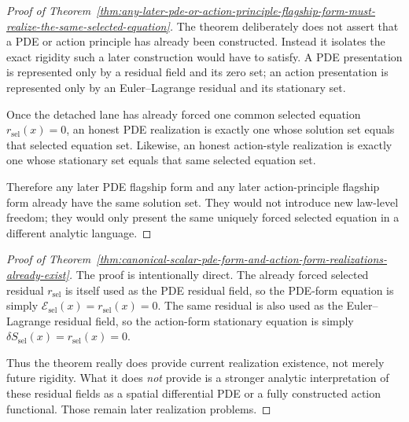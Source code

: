 \begin{proof}[Proof of Theorem~\ref{thm:any-later-pde-or-action-principle-flagship-form-must-realize-the-same-selected-equation}]
\label{proof:thm:any-later-pde-or-action-principle-flagship-form-must-realize-the-same-selected-equation}
The theorem deliberately does not assert that a PDE or action principle has
already been constructed. Instead it isolates the exact rigidity such a later
construction would have to satisfy. A PDE presentation is represented only by a
residual field and its zero set; an action presentation is represented only by
an Euler--Lagrange residual and its stationary set.

Once the detached lane has already forced one common selected equation
\(r_{\mathrm{sel}}(x)=0\), an honest PDE realization is exactly one whose
solution set equals that selected equation set. Likewise, an honest
action-style realization is exactly one whose stationary set equals that same
selected equation set.

Therefore any later PDE flagship form and any later action-principle flagship
form already have the same solution set. They would not introduce new
law-level freedom; they would only present the same uniquely forced selected
equation in a different analytic language.
\end{proof}

\begin{proof}[Proof of Theorem~\ref{thm:canonical-scalar-pde-form-and-action-form-realizations-already-exist}]
\label{proof:thm:canonical-scalar-pde-form-and-action-form-realizations-already-exist}
The proof is intentionally direct. The already forced selected residual
\(r_{\mathrm{sel}}\) is itself used as the PDE residual field, so the PDE-form
equation is simply \(\mathcal{E}_{\mathrm{sel}}(x)=r_{\mathrm{sel}}(x)=0\).
The same residual is also used as the Euler--Lagrange residual field, so the
action-form stationary equation is simply
\(\delta S_{\mathrm{sel}}(x)=r_{\mathrm{sel}}(x)=0\).

Thus the theorem really does provide current realization existence, not merely
future rigidity. What it does \emph{not} provide is a stronger analytic
interpretation of these residual fields as a spatial differential PDE or a
fully constructed action functional. Those remain later realization problems.
\end{proof}

